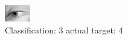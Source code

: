 \begin{figure}[h!]
\begin{center}
\includegraphics[width=0.60\columnwidth]{figures/ID2991_class_3_target_4.png}
\end{center}
\caption{ Classification: 3 actual target: 4}
\label{fig:ID2991_class_3_target_4}
\end{figure}
